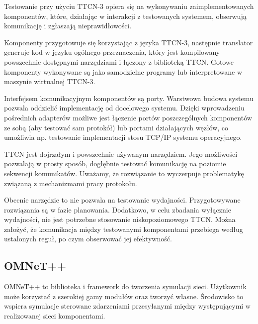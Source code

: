 \documentclass[00-praca-magisterska.tex]{subfiles}
\begin{document}

Testowanie przy użyciu TTCN-3 opiera się na wykonywaniu zaimplementowanych
komponentów, które, działając w interakcji z testowanych systemem, obserwują
komunikację i zgłaszają nieprawidłowości.

Komponenty przygotowuje się korzystając z języka TTCN-3, następnie translator
generuje kod w języku ogólnego przeznaczenia, który jest kompilowany powszechnie
dostępnymi narzędziami i łączony z biblioteką TTCN. Gotowe komponenty wykonywane
są jako samodzielne programy lub interpretowane w maszynie wirtualnej TTCN-3.

Interfejsem komunikacyjnym komponentów są porty. Warstwowa budowa systemu
pozwala oddzielić implementację od docelowego systemu. Dzięki wprowadzeniu
pośrednich adapterów możliwe jest łączenie portów poszczególnych komponentów ze
sobą (aby testować sam protokół) lub portami działających węzłów, co umożliwia
np. testowanie implementacji stosu TCP/IP systemu operacyjnego.


TTCN jest dojrzałym i powszechnie używanym narzędziem. Jego możliwości pozwalają
w prosty sposób, dogłębnie testować komunikację na poziomie sekwencji
komunikatów. Uważamy, że rozwiązanie to wyczerpuje problematykę związaną z
mechanizmami pracy protokołu.

Obecnie narzędzie to nie pozwala na testowanie wydajności. Przygotowywane
rozwiązania są w fazie planowania. Dodatkowo, w celu zbadania wyłącznie
wydajności, nie jest potrzebne stosowanie niskopoziomowego TTCN. Można założyć,
że komunikacja między testowanymi komponentami przebiega według ustalonych
reguł, po czym obserwować jej efektywność.

\subsection{OMNeT++}

OMNeT++ to biblioteka i framework do tworzenia symulacji sieci. Użytkownik może korzystać z
szerokiej gamy modułów oraz tworzyć własne. Środowisko to wspiera symulacje
sterowane zdarzeniami przesyłanymi między występującymi w realizowanej sieci
komponentami.
\end{document}
